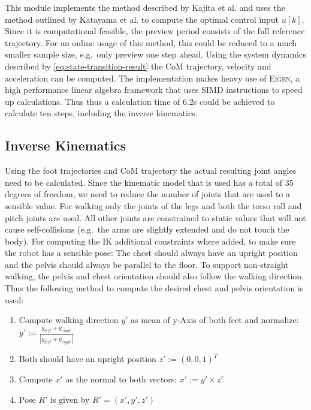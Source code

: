 \documentclass[english,ngerman]{KITreprt}
\newcommand{\name}[1]{\textsc{#1}}
\begin{document}
This module implements the method described by Kajita et al. and uses
the method outlined by Katayama et al. to compute the optimal control
input $u[k]$. Since it is computational feasible, the preview period
consists of the full reference trajectory. For an online usage of this
method, this could be reduced to a much smaller sample size, e.g.~only
preview one step ahead. Using the system dynamics described by
\ref{eq:state-transition-result} the CoM trajectory, velocity and
acceleration can be computed. The implementation makes heavy use of
\name{Eigen}, a high performance linear algebra framework that uses SIMD
instructions to speed up calculations. Thus thus a calculation time of
6.2s could be achieved to calculate ten steps, including the inverse
kinematics.

\subsection{Inverse Kinematics}\label{inverse-kinematics}

Using the foot trajectories and CoM trajectory the actual resulting
joint angles need to be calculated. Since the kinematic model that is
used has a total of 35 degrees of freedom, we need to reduce the number
of joints that are used to a sensible value. For walking only the joints
of the legs and both the torso roll and pitch joints are used. All other
joints are constrained to static values that will not cause
self-collisions (e.g.~the arms are slightly extended and do not touch
the body). For computing the IK additional constraints where added, to
make sure the robot has a sensible pose: The chest should always have an
upright position and the pelvis should always be parallel to the floor.
To support non-straight walking, the pelvis and chest orientation should
also follow the walking direction. Thus the following method to compute
the desired chest and pelvis orientation is used:

\begin{enumerate}
\def\labelenumi{\arabic{enumi}.}
\item
  Compute walking direction $y'$ as mean of y-Axis of both feet and
  normalize: $y' := \frac{y_{left} + y_{right}}{|y_{left} + y_{right}|}$
\item
  Both should have an upright position $z' := (0, 0, 1)^T$
\item
  Compute $x'$ as the normal to both vectors: $x' := y' \times z'$
\item
  Pose $R'$ is given by $R' = (x', y', z')$
\end{enumerate}
\end{document}
